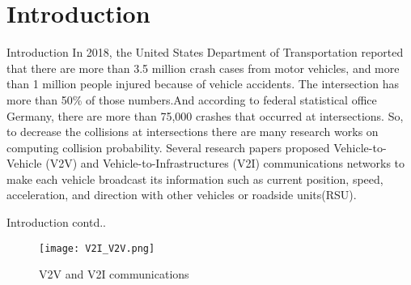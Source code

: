 \documentclass{beamer}
\begin{document}
\section{Introduction}
\begin{frame}{Introduction}
    In  2018, the United States Department of Transportation reported that there are more than 3.5 million crash cases from motor vehicles, and more than 1 million people injured because of vehicle accidents. The intersection has more than 50\% of those numbers.And according to federal statistical office Germany, there are more than 75,000 crashes that occurred at intersections. So, to decrease the collisions at intersections there are many research works on computing collision probability. Several  research  papers  proposed  Vehicle-to-Vehicle  (V2V) and Vehicle-to-Infrastructures (V2I) communications networks to  make  each  vehicle broadcast its information such as current position, speed, acceleration, and direction with other vehicles or roadside units(RSU). 
\end{frame}
\begin{frame}{Introduction contd..}
    \begin{figure}
        \centering
        \texttt{[image: V2I\_V2V.png]}
        \caption{V2V and V2I communications}
        \label{V2V and V2I communications}
    \end{figure}
\end{frame}
\end{document}
